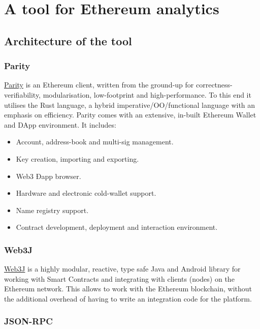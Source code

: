 \label{Chapter3}

\chapter{A tool for Ethereum analytics}
\section{Architecture of the tool}
\subsection{Parity}
\href{https://www.parity.io/}{Parity} \cite{authors2017ethereum} is an Ethereum client, written from the ground-up for correctness-verifiability, modularisation, low-footprint and high-performance. \newline
To this end it utilises the Rust language, a hybrid imperative/OO/functional language with an emphasis on efficiency. 
\newline
Parity comes with an extensive, in-built Ethereum Wallet and DApp environment. It includes:
\begin{itemize}
    \item Account, address-book and multi-sig management.
    \item Key creation, importing and exporting.
    \item Web3 Ðapp browser.
    \item Hardware and electronic cold-wallet support.
    \item Name registry support.
    \item Contract development, deployment and interaction environment.
\end{itemize}
\subsection{Web3J}
\label{web3j}
\href{https://web3j.io/}{Web3J} is a highly modular, reactive, type safe Java and Android library for working with Smart Contracts and integrating with clients (nodes) on the Ethereum network. 
\newline
This allows to work with the Ethereum blockchain, without the additional overhead of having to write an integration code for the platform.
\subsection{JSON-RPC}

